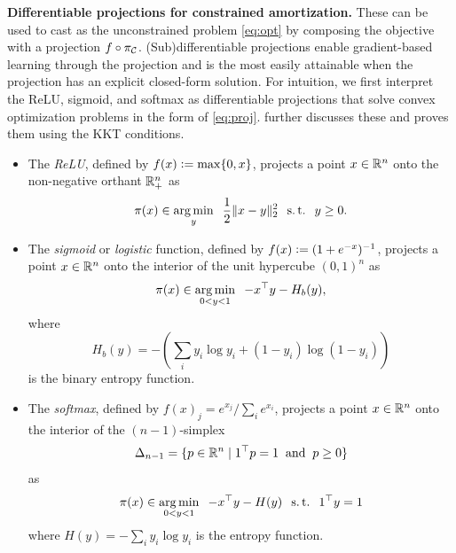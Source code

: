 \documentclass[twoside,11pt]{article}
\begin{document}
\textbf{Differentiable projections for constrained amortization.}
These can be used to cast  as the unconstrained
problem \cref{eq:opt} by composing the objective with a projection
$f\circ \pi_{\mathcal{C}}$.
(Sub)differentiable projections enable gradient-based learning through the projection
and is the most easily attainable when the projection has an explicit closed-form solution.
For intuition, we first interpret the ReLU, sigmoid, and softmax as
differentiable projections that solve convex optimization problems
in the form of \cref{eq:proj}.
\citet[\S2.4.4]{amos2019differentiable} further discusses these
and proves them using the KKT conditions.

\begin{itemize}
\item The \emph{ReLU}, defined by $f(x) \vcentcolon= \max\{0, x\}$,
  projects a point $x\in\mathbb{R}^n$ onto the non-negative
  orthant $\mathbb{R}^n_+$ as
  \begin{equation}
    \pi(x) \in \operatorname*{arg\,min}_y \;\; \frac{1}{2}\|x-y\|_2^2 \;\; \operatorname*{s.t.} \;\; y\geq 0.
    \label{eq:relu-proj}
  \end{equation}
\item The \emph{sigmoid} or \emph{logistic} function, defined by $f(x) \vcentcolon= (1+e^{-x})^{-1}$,
  projects a point $x\in\mathbb{R}^n$ onto
  the interior of the unit hypercube $(0,1)^n$ as
  \begin{equation}
    \pi(x) \in \operatorname*{arg\,min}_{0<y<1} \;\; -x^\top y -H_b(y),
    \label{eq:sigmoid-proj}
  \end{equation}
  where
  \begin{equation}
  H_b(y) = - \left(\sum_i y_i\log y_i + (1-y_i)\log (1-y_i)\right)
  \end{equation}
  is the
  binary entropy function.
\item The \emph{softmax}, defined by $f(x)_j = e^{x_j} / \sum_i e^{x_i}$,
  projects a point $x\in\mathbb{R}^n$ onto
  the interior of the $(n-1)$-simplex
  $$\Delta_{n-1}=\{p\in\mathbb{R}^n\; \vert\; 1^\top p = 1 \; \; {\rm and} \;\; p \geq 0 \}$$
  as
  \begin{equation}
    \pi(x) \in \operatorname*{arg\,min}_{0<y<1} \;\; -x^\top y - H(y) \;\; \operatorname*{s.t.}\;\; 1^\top y = 1
    \label{eq:simplex-proj}
  \end{equation}
  where $H(y) = -\sum_i y_i \log y_i$ is the entropy function.
\end{itemize}
\end{document}
